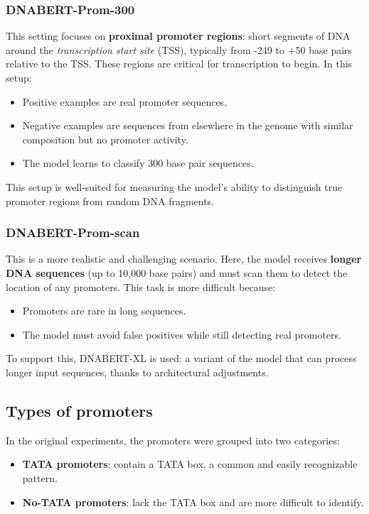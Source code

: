 \subsubsection{DNABERT-Prom-300}
This setting focuses on \textbf{proximal promoter regions}: short segments of DNA around the \textit{transcription start site} (TSS), typically from -249 to +50 base pairs relative to the TSS. These regions are critical for transcription to begin.  
In this setup:
\begin{itemize}
\item Positive examples are real promoter sequences.
\item Negative examples are sequences from elsewhere in the genome with similar composition but no promoter activity.
\item The model learns to classify 300 base pair sequences.
\end{itemize}

This setup is well-suited for measuring the model's ability to distinguish true promoter regions from random DNA fragments.

\subsubsection{DNABERT-Prom-scan}
This is a more realistic and challenging scenario. Here, the model receives \textbf{longer DNA sequences} (up to 10,000 base pairs) and must scan them to detect the location of any promoters.  
This task is more difficult because:
\begin{itemize}
\item Promoters are rare in long sequences.
\item The model must avoid false positives while still detecting real promoters.
\end{itemize}

To support this, DNABERT-XL is used: a variant of the model that can process longer input sequences, thanks to architectural adjustments.

\subsection{Types of promoters}

In the original experiments, the promoters were grouped into two categories:
\begin{itemize}
\item \textbf{TATA promoters}: contain a TATA box, a common and easily recognizable pattern.
\item \textbf{No-TATA promoters}: lack the TATA box and are more difficult to identify.
\end{itemize}

